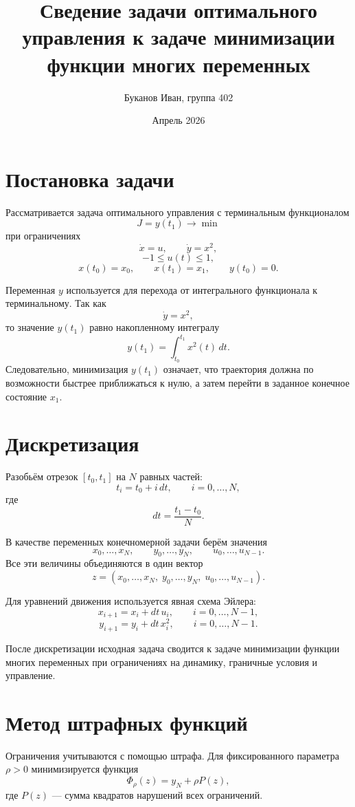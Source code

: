 \documentclass[12pt,a4paper]{article}
\title{Сведение задачи оптимального управления к задаче минимизации функции многих переменных}
\author{Буканов Иван, группа 402}
\date{Апрель 2026}
\begin{document}
\newpage
\maketitle
\newpage

\section{Постановка задачи}

Рассматривается задача оптимального управления с терминальным функционалом
\[
    J = y(t_1) \to \min
\]
при ограничениях
\[
    \dot x = u, \qquad \dot y = x^2,
\]
\[
    -1 \le u(t) \le 1,
\]
\[
    x(t_0)=x_0, \qquad x(t_1)=x_1, \qquad y(t_0)=0.
\]

Переменная \(y\) используется для перехода от интегрального функционала к терминальному. Так как
\[
    \dot y = x^2,
\]
то значение \(y(t_1)\) равно накопленному интегралу
\[
    y(t_1)=\int_{t_0}^{t_1} x^2(t)\,dt.
\]
Следовательно, минимизация \(y(t_1)\) означает, что траектория должна по возможности быстрее приближаться к нулю, а затем перейти в заданное конечное состояние \(x_1\).

\section{Дискретизация}

Разобьём отрезок \([t_0,t_1]\) на \(N\) равных частей:
\[
    t_i = t_0 + i\,dt, \qquad i=0,\ldots,N,
\]
где
\[
    dt = \frac{t_1-t_0}{N}.
\]

В качестве переменных конечномерной задачи берём значения
\[
    x_0,\ldots,x_N, \qquad
    y_0,\ldots,y_N, \qquad
    u_0,\ldots,u_{N-1}.
\]
Все эти величины объединяются в один вектор
\[
    z = (x_0,\ldots,x_N,\; y_0,\ldots,y_N,\; u_0,\ldots,u_{N-1}).
\]

Для уравнений движения используется явная схема Эйлера:
\[
    x_{i+1} = x_i + dt\,u_i,
    \qquad i=0,\ldots,N-1,
\]
\[
    y_{i+1} = y_i + dt\,x_i^2,
    \qquad i=0,\ldots,N-1.
\]

После дискретизации исходная задача сводится к задаче минимизации функции многих переменных при ограничениях на динамику, граничные условия и управление.

\section{Метод штрафных функций}

Ограничения учитываются с помощью штрафа. Для фиксированного параметра \(\rho>0\) минимизируется функция
\[
    \Phi_\rho(z) = y_N + \rho P(z),
\]
где \(P(z)\) --- сумма квадратов нарушений всех ограничений.
\end{document}

